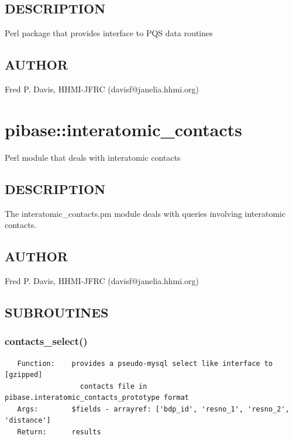 \documentclass{article}
\begin{document}
\subsection*{DESCRIPTION\label{pibase::data::external::PQS_DESCRIPTION}}


Perl package that provides interface to PQS data routines

\subsection*{AUTHOR\label{pibase::data::external::PQS_AUTHOR}}


Fred P. Davis, HHMI-JFRC (davisf@janelia.hhmi.org)

\clearpage
\section{pibase::interatomic\_contacts\label{pibase::interatomic_contacts}}


Perl module that deals with interatomic contacts

\subsection*{DESCRIPTION\label{pibase::interatomic_contacts_DESCRIPTION}}


The interatomic\_contacts.pm module deals with queries involving interatomic contacts.

\subsection*{AUTHOR\label{pibase::interatomic_contacts_AUTHOR}}


Fred P. Davis, HHMI-JFRC (davisf@janelia.hhmi.org)

\subsection*{SUBROUTINES\label{pibase::interatomic_contacts_SUBROUTINES}}
\subsubsection*{contacts\_select()\label{pibase::interatomic_contacts_contacts_select_}}
\begin{verbatim}
   Function:    provides a pseudo-mysql select like interface to [gzipped]
                  contacts file in pibase.interatomic_contacts_prototype format
   Args:        $fields - arrayref: ['bdp_id', 'resno_1', 'resno_2', 'distance']
   Return:      results
\end{verbatim}
\end{document}
